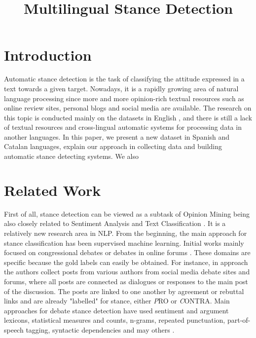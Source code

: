 \documentclass[10pt, a4paper]{article}
\title{Multilingual Stance Detection}
\begin{document}
\maketitleabstract

\section{Introduction}

Automatic stance detection is the task of classifying the attitude expressed in a text towards a given target. Nowadays, it is a rapidly growing area of natural language processing since more and more opinion-rich textual resources such as online review sites, personal blogs and social media are available. The research on this topic is conducted mainly on the datasets in English \cite{mohammad-etal-2016-semeval,augenstein-etal-2016-stance}, and there is still a lack of textual resources and cross-lingual automatic systems for processing data in another languages. In this paper, we present a new dataset in Spanish and Catalan languages, explain our approach in collecting data and building automatic stance detecting systems. We also 

\section{Related Work}

First of all, stance detection can be viewed as a subtask of Opinion Mining being also closely related to Sentiment Analysis \cite{pang2008opinion} and Text Classification \cite{aggarwal2012survey}. It is a relatively new research area in NLP. From the beginning, the main approach for stance classification has been supervised machine learning. Initial works mainly focused on congressional debates \cite{Thomas06a} or debates in online forums \cite{somasundaran-wiebe-2009-recognizing,murakami-raymond-2010-support,Anand:2011:CRD:2107653.2107654,walker-etal-2012-stance,hasan-ng-2014-taking,sridhar-etal-2014-collective}. These domains are specific because the gold labels can easily be obtained. For instance, in \cite{sridhar-etal-2014-collective} approach the authors collect posts from various authors from social media debate sites and forums, where all posts are connected as dialogues or responses to the main post of the discussion. The posts are linked to one another by agreement or rebuttal links and are already "labelled" for stance, either {\emph PRO} or {\emph CONTRA}. Main approaches for debate stance detection have used sentiment and argument lexicons, statistical measures and counts, n-grams, repeated punctuation, part-of-speech tagging, syntactic dependencies and may others \cite{Wang8672602}.
\end{document}
